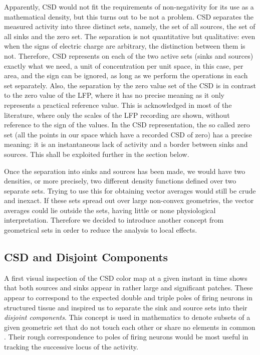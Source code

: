 \documentclass{article}
\begin{document}
Apparently, CSD would not fit the requirements of non-negativity for its use as a mathematical density, but this turns out to be not a problem.  CSD separates the measured activity into three distinct sets, namely, the set of all sources, the set of all sinks and the zero set. The separation is not quantitative but qualitative: even when the signs of electric charge are arbitrary, the distinction between them is not. Therefore, CSD represents on each of the two active sets (sinks and sources) exactly what we need, a unit of concentration per unit space, in this case, per area, and the sign can be ignored, as long as we perform the operations in each set separately. Also, the separation by the zero value set of the CSD is in contrast to the zero value of the LFP, where it has no precise meaning as it only represents a practical reference value. This is acknowledged in most of the literature, where only the scales of the LFP recording are shown, without reference to the sign of the values. In the CSD representation,  the so called zero set (all the points in our space which have a recorded CSD of zero)  has a precise meaning: it is an instantaneous lack of activity and a border between sinks and sources. This shall be exploited further in the section below.

Once the separation into sinks and sources has been made, we would have two densities, or more precisely, two different density functions defined over two separate sets. Trying to use this for obtaining vector averages would still be crude and inexact. If these sets spread out over large non-convex geometries, the vector averages could lie outside the sets, having little or none physiological interpretation. Therefore we decided to introduce another concept from geometrical sets in order to reduce the analysis to local effects.


\subsection{CSD and Disjoint Components}

A first visual inspection of the CSD color map at a given instant in time shows that both sources and sinks appear in rather large and significant patches. These appear to correspond to the expected double and triple poles of firing neurons in structured tissue \cite{Buzsaki2012} and inspired us to separate the sink and source  sets into their \emph{disjoint components}. This concept is used in mathematics to denote subsets of a given geometric set that do not touch each other or share no elements in common \cite{Halmos}. Their rough correspondence to poles of firing neurons would be most useful in tracking the successive locus of the activity.
\end{document}
